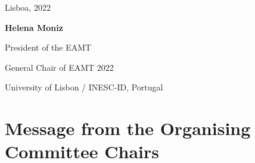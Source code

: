 \documentclass[a4paper,11pt,twoside]{book}
\begin{document}
\vspace{1cm}

\noindent Lisboa, 2022

\vspace{0.5cm}

\noindent \textbf{Helena Moniz}

\noindent President of the EAMT

\noindent General Chair of EAMT 2022

\noindent University of Lisbon / INESC-ID, Portugal



\chapter*{Message from the Organising Committee Chairs}
\end{document}
